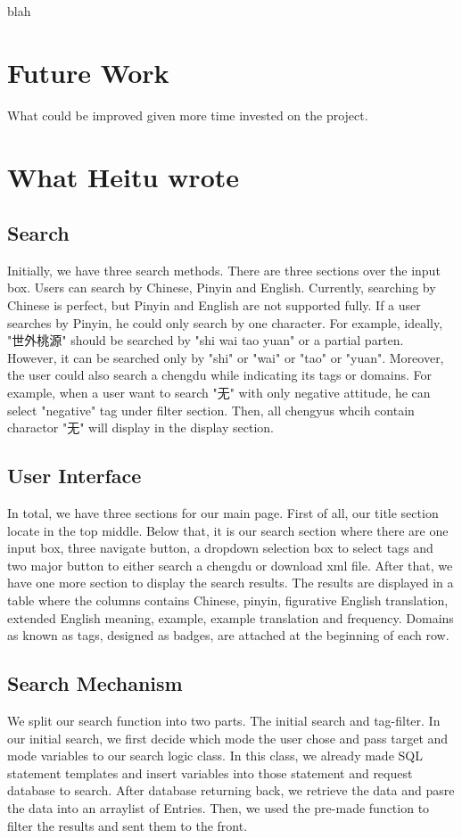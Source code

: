 \documentclass[11pt]{article} %
\begin{document}
\indent blah\\

\section{Future Work}

\indent What could be improved given more time invested on the project. 

\section{What Heitu wrote}
\subsection{Search}
\indent Initially, we have three search methods. There are three sections over the input box. Users can search by Chinese, Pinyin and English. Currently, searching by Chinese is perfect, but Pinyin and English are not supported fully. If a user searches by Pinyin, he could only search by one character. For example, ideally, "世外桃源" should be searched by "shi wai tao yuan" or a partial parten. However, it can be searched only by "shi" or "wai" or "tao" or "yuan". Moreover, the user could also search a chengdu while indicating its tags or domains. For example, when a user want to search "无" with only negative attitude, he can select "negative" tag under filter section. Then, all chengyus whcih contain charactor "无" will display in the display section. 

\subsection{User Interface}
\indent In total, we have three sections for our main page. First of all, our title section locate in the top middle. Below that, it is our search section where there are one input box, three navigate button, a dropdown selection box to select tags and two major button to either search a chengdu or download xml file. After that, we have one more section to display the search results. The results are displayed in a table where the columns contains Chinese, pinyin, figurative English translation, extended English meaning, example, example translation and frequency. Domains as known as tags, designed as badges, are attached at the beginning of each row.

\subsection{Search Mechanism}
\indent We split our search function into two parts. The initial search and tag-filter. In our initial search, we first decide which mode the user chose and pass target and mode variables to our search logic class. In this class, we already made SQL statement templates and insert variables into those statement and request database to search. After database returning back, we retrieve the data and pasre the data into an arraylist of Entries. Then, we used the pre-made function to filter the results and sent them to the front.



\end{document}

